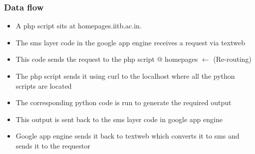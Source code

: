 \documentclass[]{beamer}
\begin{document}
\begin{frame}
	\frametitle{Data flow}   
  	\begin{itemize}
	\justifying
	\item A php script sits at homepages.iitb.ac.in.
	\item The sms layer code in the google app engine receives a request via textweb
	\item This code sends the request to the php script @ homepages \color{red} $\leftarrow$ (Re-routing)
	\item \color{black} The php script sends it using curl to the localhost where all the python scripts are located
  	\item The corresponding python code is run to generate the required output
	\item This output is sent back to the sms layer code in google app engine
	\item Google app engine sends it back to textweb which converts it to sms and sends it to the requestor
	\end{itemize}
\end{frame}
\end{document}
